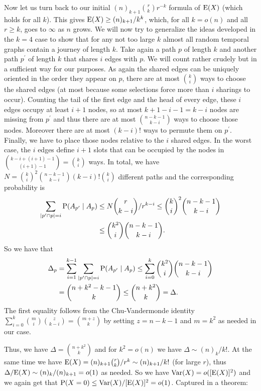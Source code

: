 \documentclass[oribibl, 11pt]{llncs}
\renewcommand{\P}{\textup{P}}
\newcommand{\E}{\textup{E}}
\newcommand{\Var}{\textup{Var}}
\begin{document}
Now let us turn back to our initial $(n)_{k+1}\binom{r}{k}r^{-k}$ formula of $\E(X)$ (which holds for all $k$). This gives $\E(X)\geq (n)_{k+1}/k^k$, which, for all $k=o(n)$ and all $r\geq k$, goes to $\infty$ as $n$ grows. We will now try to generalize the ideas developed in the $k=4$ case to show that for any not too large $k$ almost all random temporal graphs contain a journey of length $k$. Take again a path $p$ of length $k$ and another path $p^\prime$ of length $k$ that shares $i$ edges with $p$. We will count rather crudely but in a sufficient way for our purposes. As again the shared edges can be uniquely oriented in the order they appear on $p$, there are at most $\binom{k}{i}$ ways to choose the shared edges (at most because some selections force more than $i$ sharings to occur). Counting the tail of the first edge and the head of every edge, these $i$ edges occupy at least $i+1$ nodes, so at most $k+1-i-1=k-i$ nodes are missing from $p^\prime$ and thus there are at most $\binom{n-k-1}{k-i}$ ways to choose those nodes. Moreover there are at most $(k-i)!$ ways to permute them on $p^\prime$. Finally, we have to place those nodes relative to the $i$ shared edges. In the worst case, the $i$ edges define $i+1$ slots that can be occupied by the nodes in $\binom{k-i+(i+1)-1}{(i+1)-1}=\binom{k}{i}$ ways. In total, we have $N=\binom{k}{i}^2\binom{n-k-1}{k-i}(k-i)!\binom{k}{i}$ different paths and the corresponding probability is 
\begin{align*}
\sum_{|p^\prime\cap p|=i}\P(A_{p^\prime}\mid A_p)&\leq N\binom{r}{k-i}/r^{k-i}\leq \binom{k}{i}^2\binom{n-k-1}{k-i}\\
&\leq \binom{k^2}{i}\binom{n-k-1}{k-i}.  
\end{align*}
So we have that
\begin{align*}
\Delta_p &=\sum_{i=1}^{k-1}\sum_{|p^\prime\cap p|=i}\P(A_{p^\prime}\mid A_p)\leq \sum_{i=0}^k \binom{k^2}{i}\binom{n-k-1}{k-i}\\
&=\binom{n+k^2-k-1}{k}\leq \binom{n+k^2}{k}=\Delta.
\end{align*}
The first equality follows from the Chu-Vandermonde identity $\sum_{i=0}^k\binom{m}{i}\binom{z}{k-i}=\binom{m+z}{k}$ by setting $z=n-k-1$ and $m=k^2$ as needed in our case.

Thus, we have $\Delta=\binom{n+k^2}{k}$ and for $k^2=o(n)$ we have $\Delta\sim (n)_k/k!$. At the same time we have $\E(X)=(n)_{k+1}\binom{r}{k}/r^k\sim (n)_{k+1}/k!$ (for large $r$), thus $\Delta/\E(X)\sim (n)_k/(n)_{k+1}=o(1)$ as needed. So we have $\Var(X)=o([\E(X)]^2)$ and we again get that $\P(X=0)\leq \Var(X)/[\E(X)]^2=o(1)$. Captured in a theorem:
\end{document}
